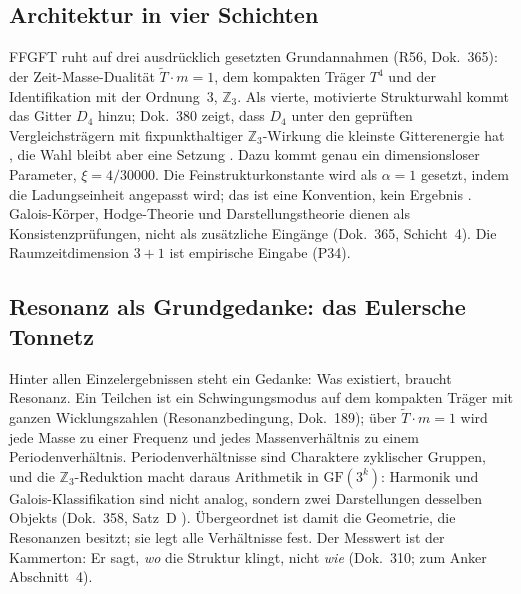 \subsection{Architektur in vier Schichten}

FFGFT ruht auf drei ausdrücklich gesetzten Grundannahmen (R56, Dok.~365): der Zeit-Masse-Dualität
$\tilde T\cdot m=1$, dem kompakten Träger $T^4$ und der Identifikation mit der Ordnung~3,
$\mathbb{Z}_3$. Als vierte, motivierte Strukturwahl kommt das Gitter $D_4$ hinzu; Dok.~380 zeigt,
dass $D_4$ unter den geprüften Vergleichsträgern mit fixpunkthaltiger $\mathbb{Z}_3$-Wirkung die
kleinste Gitterenergie hat \KM, die Wahl bleibt aber eine Setzung \SM. Dazu kommt genau ein
dimensionsloser Parameter, $\xi=4/30000$. Die Feinstrukturkonstante wird als $\alpha=1$ gesetzt,
indem die Ladungseinheit angepasst wird; das ist eine Konvention, kein Ergebnis \QM.
Galois-Körper, Hodge-Theorie und Darstellungstheorie dienen als Konsistenzprüfungen, nicht als
zusätzliche Eingänge (Dok.~365, Schicht~4). Die Raumzeitdimension $3+1$ ist empirische Eingabe
(P34).

\subsection{Resonanz als Grundgedanke: das Eulersche Tonnetz}

Hinter allen Einzelergebnissen steht ein Gedanke: Was existiert, braucht Resonanz. Ein Teilchen
ist ein Schwingungsmodus auf dem kompakten Träger mit ganzen Wicklungszahlen
(Resonanzbedingung, Dok.~189); über $\tilde T\cdot m=1$ wird jede Masse zu einer Frequenz und
jedes Massenverhältnis zu einem Periodenverhältnis. Periodenverhältnisse sind Charaktere
zyklischer Gruppen, und die $\mathbb{Z}_3$-Reduktion macht daraus Arithmetik in
$\mathrm{GF}(3^k)$: Harmonik und Galois-Klassifikation sind nicht analog, sondern zwei
Darstellungen desselben Objekts (Dok.~358, Satz~D \BM). Übergeordnet ist damit die Geometrie, die
Resonanzen besitzt; sie legt alle Verhältnisse fest. Der Messwert ist der Kammerton: Er sagt,
\emph{wo} die Struktur klingt, nicht \emph{wie} (Dok.~310; zum Anker Abschnitt~4).

